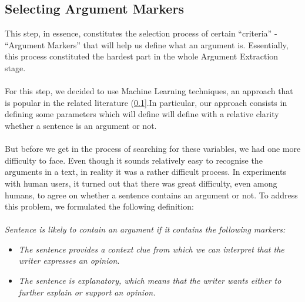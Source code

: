 \subsection{Selecting Argument Markers}\label{321_ref}
This step, in essence, constitutes the selection process of certain ``criteria'' - ``Argument Markers'' that will help us define what an argument is. Essentially, this process constituted the hardest part in the whole Argument Extraction stage.\\
\\
For this step, we decided to use Machine Learning techniques, an approach that is popular in the related literature (\ref{321_ref}].In particular, our approach consists in defining some parameters which will define will define with a relative clarity whether a sentence is an argument or not.\\
\\
But before we get in the process of searching for these variables, we had one more difficulty to face. Even though it sounds relatively easy to recognise the arguments in a text, in reality it was a rather difficult process. In experiments with human users, it turned out that there was great difficulty, even among humans, to agree on whether a sentence contains an argument or not. To address this problem, we formulated the following definition:\\
\\
\textit{Sentence is likely to contain an argument if it contains the following markers:\\}
\begin{itemize}

	\item \textit{The sentence provides a context clue from which we can interpret that the writer expresses an opinion}.
	\item \textit{The sentence is explanatory, which means that the writer wants either to further explain or support an opinion.\\}
	
\end{itemize}

